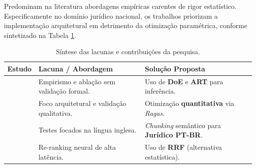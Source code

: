 Predominam na literatura abordagens empíricas carentes de rigor estatístico. Especificamente no domínio jurídico nacional, os trabalhos priorizam a implementação arquitetural em detrimento da otimização paramétrica, conforme sintetizado na Tabela \ref{tab:comparativo_lacunas}.

\begin{table}[ht!]
  \centering
  \caption{Síntese das lacunas e contribuições da pesquisa.}
  \label{tab:comparativo_lacunas}
  \small %
  \begin{tabular}{@{}lll@{}}
    \toprule
    \textbf{Estudo} & \textbf{Lacuna / Abordagem} & \textbf{Solução Proposta} \\ \midrule

    \citet{wang2024} &
    Empirismo e ablação sem validação formal. &
    Uso de \textbf{DoE} e \textbf{ART} para inferência. \\ \addlinespace

    \citet{aquino2024} &
    Foco arquitetural e validação qualitativa. &
    Otimização \textbf{quantitativa} via \textit{Ragas}. \\ \addlinespace

    \citet{thepowerofchunking} &
    Testes focados na língua inglesa. &
    \textit{Chunking} semântico para \textbf{Jurídico PT-BR}. \\ \addlinespace

    \citet{rankrag} &
    Re-ranking neural de alta latência. &
    Uso de \textbf{RRF} (alternativa estatística). \\ \bottomrule
  \end{tabular}
\end{table}
